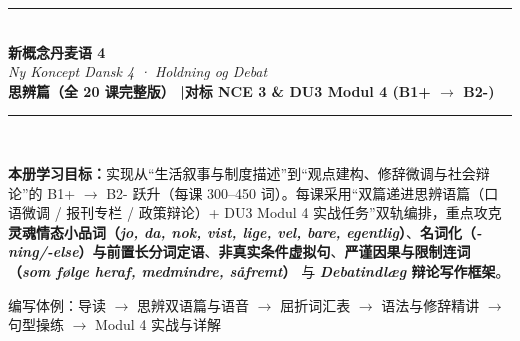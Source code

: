 \documentclass[11pt, a4paper]{ctexart}
\begin{document}
\begin{titlepage}
  \centering
  \vspace*{2.5cm}
  {\color{NCDRed}\rule{\linewidth}{2.5pt}}\\[1.2cm]
  {\fontsize{34}{40}\selectfont\bfseries\color{NCDNavy} 新概念丹麦语 4}\\[0.5cm]
  {\huge\itshape\color{NCDTeal} Ny Koncept Dansk 4 · Holdning og Debat}\\[0.8cm]
  {\large\bfseries\color{NCDGray} 思辨篇（全 20 课完整版） \quad|\quad 对标 NCE 3 \& DU3 Modul 4 (B1+ $\rightarrow$ B2-)}\\[1.2cm]
  {\color{NCDRed}\rule{\linewidth}{2.5pt}}\\[2cm]

  \begin{tcolorbox}[
    colback=NCDBgBlue,
    colframe=NCDNavy,
    width=0.90\linewidth,
    arc=4pt,
    boxrule=0.8pt,
    left=14pt, right=14pt, top=12pt, bottom=12pt
  ]
    \textbf{\color{NCDNavy}本册学习目标：}实现从“生活叙事与制度描述”到“观点建构、修辞微调与社会辩论”的 B1+ $\rightarrow$ B2- 跃升（每课 300--450 词）。每课采用“双篇递进思辨语篇（口语微调 / 报刊专栏 / 政策辩论）+ DU3 Modul 4 实战任务”双轨编排，重点攻克 \textbf{灵魂情态小品词（\textit{jo, da, nok, vist, lige, vel, bare, egentlig}）}、\textbf{名词化（\textit{-ning/-else}）与前置长分词定语}、\textbf{非真实条件虚拟句}、\textbf{严谨因果与限制连词（\textit{som følge heraf, medmindre, såfremt}）} 与 \textbf{\textit{Debatindlæg} 辩论写作框架}。
  \end{tcolorbox}

  \vfill
  {\large\color{NCDGray} 编写体例：导读 $\rightarrow$ 思辨双语篇与语音 $\rightarrow$ 屈折词汇表 $\rightarrow$ 语法与修辞精讲 $\rightarrow$ 句型操练 $\rightarrow$ Modul 4 实战与详解}
\end{titlepage}

\tableofcontents
\clearpage







\end{document}
